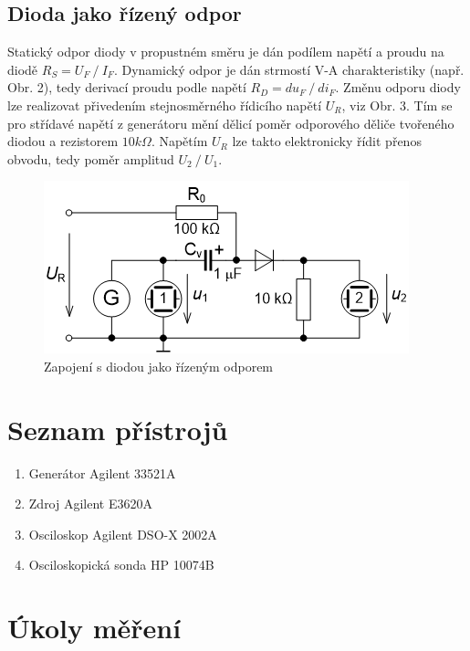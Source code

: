 \documentclass[a4paper, czech]{article}
\begin{document}
\subsection{Dioda jako řízený odpor}

Statický odpor diody v propustném směru je dán podílem
napětí a proudu na diodě $R_S = U_F\ /\ I_F$.
Dynamický odpor je dán strmostí V-A charakteristiky (např. Obr. 2),
tedy derivací proudu podle napětí $R_D
= du_F\ /\ di_F$. Změnu odporu diody lze realizovat
přivedením stejnosměrného řídicího napětí $U_R$,
viz Obr. 3.
Tím se pro střídavé napětí z generátoru mění dělicí poměr odporového
děliče tvořeného diodou a rezistorem $10 k\Omega$. Napětím $U_R$ lze takto elektronicky řídit přenos
obvodu, tedy poměr amplitud $U_2\ /\ U_1$.

\begin{figure}[H]
    \centering
    \includegraphics{obr3.png}
    \caption{Zapojení s diodou jako řízeným odporem}
\end{figure}

\section{Seznam přístrojů}

\begin{enumerate}
    \item Generátor Agilent 33521A
    \item Zdroj Agilent E3620A
    \item Osciloskop Agilent DSO-X 2002A
    \item Osciloskopická sonda HP 10074B
\end{enumerate}

\section{Úkoly měření}
\end{document}
